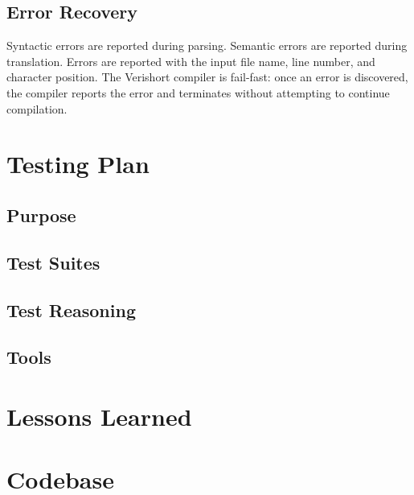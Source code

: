 \documentclass[letterpaper,11pt]{article}
\begin{document}
    \subsection{Error Recovery}
	Syntactic errors are reported during parsing.  Semantic errors are reported during translation.  Errors are reported with the input file name, line number, and character position.  The Verishort compiler is fail-fast: once an error is discovered, the compiler reports the error and terminates without attempting to continue compilation.
\section{Testing Plan}
    \subsection{Purpose}
    \subsection{Test Suites}
    \subsection{Test Reasoning}
    \subsection{Tools}
    
\section{Lessons Learned}

\newpage
        
\section{Codebase}










\end{document}
